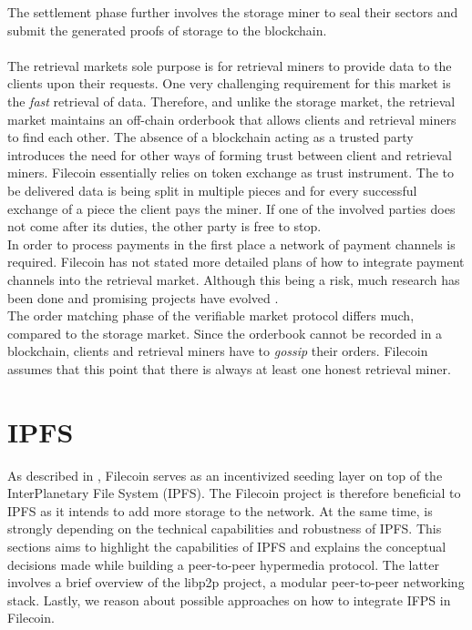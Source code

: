 \documentclass[conference]{IEEEtran}
\begin{document}
The settlement phase further involves the storage miner to seal their sectors and submit the generated proofs of storage to the blockchain.\cite{filecoin}
\\
\\
The retrieval markets sole purpose is for retrieval miners to provide data to the clients upon their requests.
One very challenging requirement for this market is the \textit{fast} retrieval of data.
Therefore, and unlike the storage market, the retrieval market maintains an off-chain orderbook that allows clients and retrieval miners to find each other.
The absence of a blockchain acting as a trusted party introduces the need for other ways of forming trust between client and retrieval miners.
Filecoin essentially relies on token exchange as trust instrument.
The to be delivered data is being split in multiple pieces and for every successful exchange of a piece the client pays the miner.
If one of the involved parties does not come after its duties, the other party is free to stop.
\\
\indent In order to process payments in the first place a network of payment channels is required.
Filecoin has not stated more detailed plans of how to integrate payment channels into the retrieval market. 
Although this being a risk, much research has been done and promising projects have evolved \cite{lightning}.
\\
\indent The order matching phase of the verifiable market protocol differs much, compared to the storage market.
Since the orderbook cannot be recorded in a blockchain, clients and retrieval miners have to \textit{gossip} their orders.
Filecoin assumes that this point that there is always at least one honest retrieval miner.
\cite{filecoin}

\section{IPFS}
\label{sec:ipfs}
As described in \cite{filecoin}, Filecoin serves as an incentivized seeding layer on top of the InterPlanetary File System (IPFS)\cite{ipfs-whitepaper}.
The Filecoin project is therefore beneficial to IPFS as it intends to add more storage to the network. At the same time, is strongly depending on the technical capabilities and robustness of IPFS.
This sections aims to highlight the capabilities of IPFS and explains the conceptual decisions made while building a peer-to-peer hypermedia protocol.
The latter involves a brief overview of the libp2p project\cite{libp2p}, a modular peer-to-peer networking stack.
Lastly, we reason about possible approaches on how to integrate IFPS in Filecoin.
\end{document}
